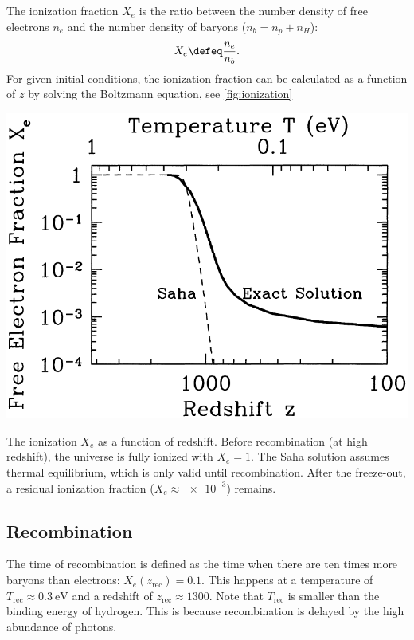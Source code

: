 The ionization fraction $X_e$ is the ratio between the number density of free electrons $n_e$ and the number density of baryons ($n_b = n_p + n_H$):
\begin{align*}
	X_e \defeq \frac{n_e}{n_b}.
\end{align*}
For given initial conditions, the ionization fraction can be calculated as a function of $z$ by solving the Boltzmann equation, see \cref{fig:ionization}

\begin{marginfigure}
	\centering
	\includegraphics[width=\textwidth]{img/ch-02/ionization.png}
	\caption{The ionization $X_e$ as a function of redshift. Before recombination (at high redshift), the universe is fully ionized with $X_e=1$. The Saha solution assumes thermal equilibrium, which is only valid until recombination. After the freeze-out, a residual ionization fraction ($X_e \approx \num{e-3}$) remains.}
	\label{fig:ionization}
\end{marginfigure}

\subsection{Recombination}

The time of recombination is defined as the time when there are ten times more baryons than electrons: $X_e(z_\text{rec}) = 0.1$. This happens at a temperature of $T_\text{rec} \approx \SI{0.3}{\eV}$ and a redshift of $z_\text{rec} \approx 1300$. Note that $T_\text{rec}$ is smaller than the binding energy of hydrogen. This is because recombination is delayed by the high abundance of photons.

